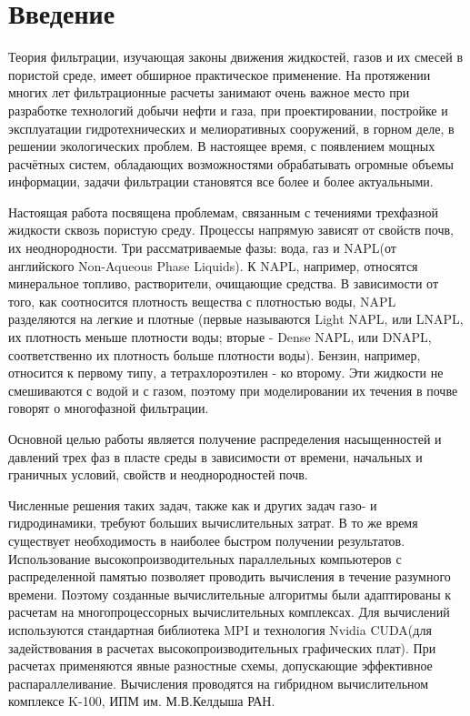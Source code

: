\section{Введение}
Теория фильтрации, изучающая законы движения жидкостей, газов и их смесей в
пористой среде, имеет обширное практическое применение. На протяжении многих лет
фильтрационные расчеты занимают очень важное место при разработке технологий
добычи нефти и газа, при проектировании, постройке и эксплуатации
гидротехнических  и мелиоративных сооружений, в горном деле, в решении
экологических проблем. В настоящее время, с появлением мощных расчётных систем,
обладающих возможностями обрабатывать огромные объемы информации, задачи фильтрации
становятся все более и более актуальными.

Настоящая работа посвящена проблемам, связанным с течениями трехфазной жидкости 
сквозь пористую среду. Процессы напрямую зависят от свойств почв, их неоднородности. 
Три рассматриваемые фазы: вода, газ и NAPL(от английского Non-Aqueous Phase 
Liquids). К NAPL, например, относятся минеральное топливо, растворители, очищающие средства. 
В зависимости от того, как соотносится плотность вещества с плотностью воды, 
NAPL разделяются на легкие и плотные (первые называются Light NAPL, или LNAPL, их плотность меньше плотности
воды; вторые - Dense NAPL, или DNAPL, соответственно их плотность больше
плотности воды). Бензин, например, относится к первому типу, а тетрахлороэтилен
- ко второму. Эти жидкости не смешиваются с водой и с газом, поэтому при моделировании их течения
в почве говорят  о многофазной фильтрации.

Основной целью работы является получение распределения насыщенностей и давлений
трех фаз в пласте среды в зависимости от времени, начальных и граничных
условий, свойств и неоднородностей почв. 

Численные решения таких задач, также как и других задач газо- и гидродинамики,
требуют больших вычислительных затрат. В то же время существует необходимость в
наиболее быстром получении результатов. Использование
высокопроизводительных параллельных компьютеров с распределенной памятью
позволяет проводить вычисления в течение разумного времени. Поэтому созданные
вычислительные алгоритмы были адаптированы к расчетам на многопроцессорных
вычислительных комплексах. Для вычислений используются стандартная
библиотека MPI и технология Nvidia CUDA(для задействования в расчетах 
высокопроизводительных графических плат). При расчетах применяются явные разностные 
схемы, допускающие эффективное распараллеливание. Вычисления проводятся
на гибридном вычислительном комплексе K-100, ИПМ им. М.В.Келдыша РАН.
